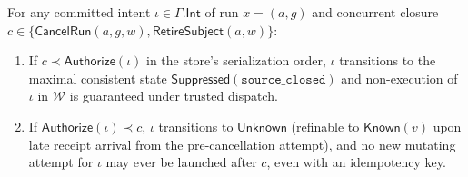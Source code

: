 \begin{theorem}
\label{thm:dichotomy}
For any committed intent $\iota \in \Gamma.\mathsf{Int}$ of run $x=(a,g)$ and concurrent closure $c \in \{\mathsf{CancelRun}(a,g,w), \mathsf{RetireSubject}(a,w)\}$:
\begin{enumerate}
  \item If $c \prec \mathsf{Authorize}(\iota)$ in the store's serialization order, $\iota$ transitions to the maximal consistent state $\mathsf{Suppressed}(\mathtt{source\_closed})$ and non-execution of $\iota$ in $\mathcal{W}$ is guaranteed under trusted dispatch.
  \item If $\mathsf{Authorize}(\iota) \prec c$, $\iota$ transitions to $\mathsf{Unknown}$ (refinable to $\mathsf{Known}(v)$ upon late receipt arrival from the pre-cancellation attempt), and no new mutating attempt for $\iota$ may ever be launched after $c$, even with an idempotency key.
\end{enumerate}
\end{theorem}

